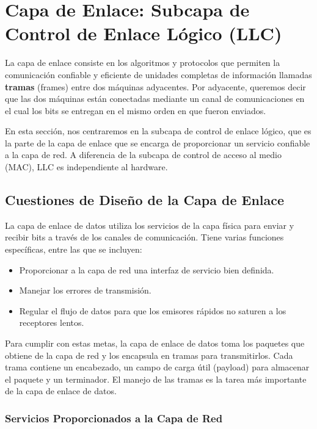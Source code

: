 \section{Capa de Enlace: Subcapa de Control de Enlace Lógico (LLC)}

La capa de enlace consiste en los algoritmos y protocolos que permiten la comunicación confiable y eficiente de unidades completas de información llamadas \textbf{tramas} (frames) entre dos máquinas adyacentes. Por adyacente, queremos decir que las dos máquinas están conectadas mediante un canal de comunicaciones en el cual los bits se entregan en el mismo orden en que fueron enviados.

En esta sección, nos centraremos en la subcapa de control de enlace lógico, que es la parte de la capa de enlace que se encarga de proporcionar un servicio confiable a la capa de red. A diferencia de la subcapa de control de acceso al medio (MAC), LLC es independiente al hardware.

\subsection{Cuestiones de Diseño de la Capa de Enlace}

La capa de enlace de datos utiliza los servicios de la capa física para enviar y recibir bits a través de los canales de comunicación. Tiene varias funciones específicas, entre las que se incluyen:

\begin{itemize}
  \item Proporcionar a la capa de red una interfaz de servicio bien definida.

  \item Manejar los errores de transmisión.

  \item Regular el flujo de datos para que los emisores rápidos no saturen a los receptores lentos.
\end{itemize}

Para cumplir con estas metas, la capa de enlace de datos toma los paquetes que obtiene de la capa de red y los encapsula en tramas para transmitirlos. Cada trama contiene un encabezado, un campo de carga útil (payload) para almacenar el paquete y un terminador. El manejo de las
tramas es la tarea más importante de la capa de enlace de datos.

\subsubsection{Servicios Proporcionados a la Capa de Red}

